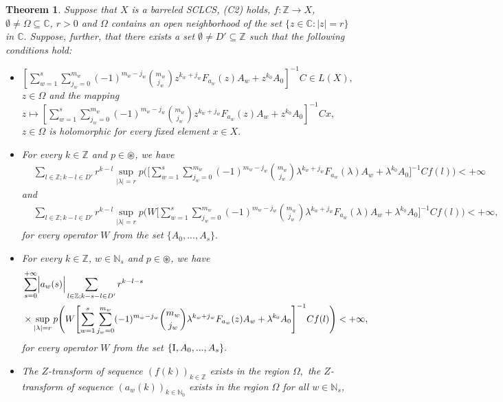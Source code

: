 \documentclass{amsart}
\newtheorem{thm}{Theorem}[section]
\theoremstyle{definition}
\theoremstyle{remark}
\numberwithin{equation}{section}
\begin{document}
\begin{thm}\label{movesvoltw}
Suppose that $X$ is a barreled \emph{SCLCS}, \emph{(C2)} holds, $f: {\mathbb Z} \rightarrow X$, $\emptyset \neq \Omega \subseteq {\mathbb C}$, $r>0$ and $\Omega$ contains an open neighborhood of the set $\{z\in {\mathbb C} : |z|=r\} $ in ${\mathbb C}.$ 
Suppose, further, that there exists a set $\emptyset \neq D' \subseteq {\mathbb Z}$ such that the following conditions hold:
\begin{itemize}
\item[(i)] $[\sum_{w=1}^{s}\sum_{j_{w}=0}^{m_{w}}(-1)^{m_{w}-j_{w}}\binom{m_{w}}{j_{w}}z^{k_{w}+j_{w}}F_{a_{w}}(z)A_{w}+z^{k_{0}}A_{0}] ^{-1}C\in L(X),$ $z\in \Omega$ and the mapping $z\mapsto [\sum_{w=1}^{s}\sum_{j_{w}=0}^{m_{w}}(-1)^{m_{w}-j_{w}}\binom{m_{w}}{j_{w}}z^{k_{w}+j_{w}}F_{a_{w}}(z)A_{w}+z^{k_{0}}A_{0}] ^{-1}Cx,$ $z\in \Omega$ is holomorphic for every fixed element $x\in X.$
\item[(ii)] For every $k\in {\mathbb Z}$ and $p\in \circledast $, we have{\scriptsize
\begin{align*} & 
\sum_{l\in {\mathbb Z}; k-l\in D'}r^{k-l}\sup_{|\lambda|=r}   p\Biggl( \Biggl[\sum_{w=1}^{s}\sum_{j_{w}=0}^{m_{w}}(-1)^{m_{w}-j_{w}}\binom{m_{w}}{j_{w}}\lambda^{k_{w}+j_{w}}F_{a_{w}}(\lambda)A_{w}+\lambda^{k_{0}}A_{0}\Biggr]^{-1}Cf(l)\Biggr) <+\infty
\end{align*}}and{\scriptsize
\begin{align*} & 
\sum_{l\in {\mathbb Z}; k-l\in D'}r^{k-l}\sup_{|\lambda|=r} 
p\Biggl(W\Biggl[\sum_{w=1}^{s}\sum_{j_{w}=0}^{m_{w}}(-1)^{m_{w}-j_{w}}\binom{m_{w}}{j_{w}}\lambda^{k_{w}+j_{w}}F_{a_{w}}(\lambda)A_{w}+\lambda^{k_{0}}A_{0}\Biggr]^{-1}Cf(l)\Biggr)<+\infty ,
\end{align*}}for every operator $W$ from the set $\{A_{0},...,A_{s}\}.$
\item[(iii)] For every $k\in {\mathbb Z}$, $w\in {\mathbb N}_{s}$ and $p\in \circledast $, we have{\scriptsize
\begin{align*} & 
\sum_{s=0}^{+\infty}\Bigl| a_{w}(s)\Bigr| \sum_{l\in {\mathbb Z}; k-s-l\in D'}  r^{k-l-s}  \\  &  \times \sup_{|\lambda|=r}  p\Biggl( W\Biggl[\sum_{w=1}^{s}\sum_{j_{w}=0}^{m_{w}}(-1)^{m_{w}-j_{w}}\binom{m_{w}}{j_{w}}\lambda^{k_{w}+j_{w}}F_{a_{w}}(z)A_{w}+\lambda^{k_{0}}A_{0}\Biggr]^{-1}Cf(l)\Biggr) <+\infty,
\end{align*}}for every operator $W$ from the set $\{{\rm I},A_{0},...,A_{s}\}.$
\item[(iv)] The $Z$-transform of sequence $(f(k))_{k\in {\mathbb Z}}$ exists in the region $\Omega ,$ the $Z$-transform of sequence $(a_{w}(k))_{k\in {\mathbb N}_{0}}$ exists in the region $\Omega $ for all $w\in {\mathbb N}_{s}$,

\end{itemize}
\end{thm}
\end{document}
